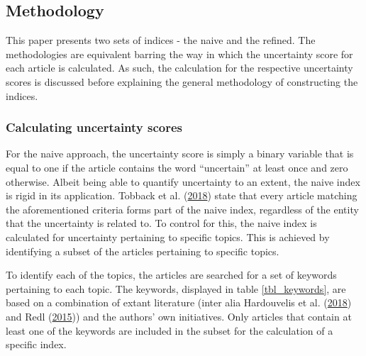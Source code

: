 \documentclass[11pt,preprint, authoryear]{elsarticle}
\numberwithin{equation}{section}
\numberwithin{figure}{section}
\numberwithin{table}{section}
\begin{document}
\subsection{\texorpdfstring{Methodology
\label{sec_method}}{Methodology }}\label{methodology}

This paper presents two sets
of indices - the naive and the refined. The methodologies are equivalent barring the way in which the uncertainty score for each article is calculated. As such, the calculation for the respective uncertainty scores is discussed before explaining the general
methodology of constructing the indices.

\subsubsection{\texorpdfstring{Calculating uncertainty scores
\label{ss_uncertaintyscore}}{Calculating uncertainty scores }}\label{calculating-uncertainty-scores}

For the naive approach, the uncertainty score is simply a binary
variable that is equal to one if the article contains the word
``uncertain'' at least once and zero otherwise. Albeit being able to
quantify uncertainty to an extent, the naive index is rigid in its
application. Tobback et al. (\protect\hyperlink{ref-Tobback2018}{2018})
state that every article matching the aforementioned criteria forms part
of the naive index, regardless of the entity that the uncertainty is
related to. To control for this, the naive index is calculated for
uncertainty pertaining to specific topics. This is achieved by
identifying a subset of the articles pertaining to specific topics. %

To identify each of the topics, the articles are searched for a set of keywords
pertaining to each topic. The keywords, displayed in table
\ref{tbl_keywords}, are based on a combination of extant
literature (inter alia Hardouvelis et al.
(\protect\hyperlink{ref-Hardouvelis2018}{2018}) and Redl
(\protect\hyperlink{ref-Redl2015}{2015})) and the authors' own initiatives. Only
articles that contain at least one of the keywords are included in the
subset for the calculation of a specific index.
\end{document}
